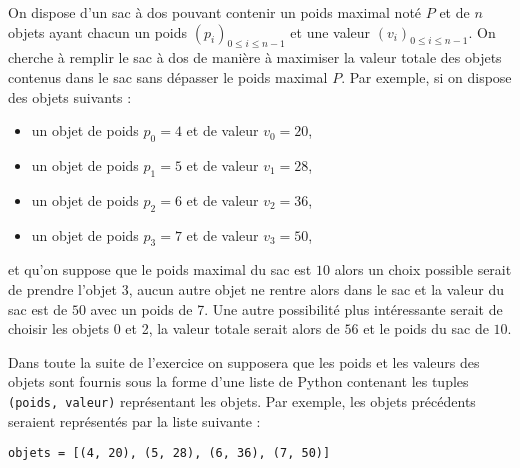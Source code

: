 \documentclass[11pt,a4paper]{article}
\begin{document}
\begin{Exercise}[title={Problème du sac à dos}]

	\medskip
	On dispose d'un sac à dos pouvant contenir un poids maximal noté $P$ et de $n$ objets ayant chacun un poids $\left(p_i\right)_{0\leqslant i \leqslant n-1}$ et une valeur $\left(v_i\right)_{0\leqslant i \leqslant n-1}$. On cherche à remplir le sac à dos de manière à maximiser la valeur totale des objets contenus dans le sac sans dépasser le poids maximal $P$.
	Par exemple, si on dispose des objets suivants :
	\begin{itemize}
		\item un objet de poids $p_0 = 4$ et de valeur $v_0 = 20$,
		\item un objet de poids $p_1 = 5$ et de valeur $v_1 = 28$,
		\item un objet de poids $p_2 = 6$ et de valeur $v_2 = 36$,
		\item un objet de poids $p_3 = 7$ et de valeur $v_3 = 50$,
	\end{itemize}
	et qu'on suppose que le poids maximal du sac est $10$ alors un choix possible serait de prendre l'objet 3, aucun autre objet ne rentre alors dans le sac et la valeur du sac est  de $50$ avec un poids de 7. Une autre possibilité plus intéressante serait de choisir les objets 0  et 2, la valeur totale serait alors de $56$ et le poids du sac de $10$.\smallskip

	Dans toute la suite de l'exercice on supposera que les poids et les valeurs des objets sont fournis sous la forme d'une liste de Python contenant les tuples {\tt (poids, valeur)} représentant les objets. Par exemple, les objets précédents seraient représentés par la liste suivante :
	\begin{verbatim}
objets = [(4, 20), (5, 28), (6, 36), (7, 50)]
\end{verbatim}


\end{Exercise}
\end{document}

